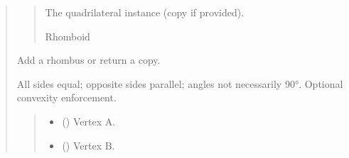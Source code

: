 \documentclass[letterpaper,10pt,english]{sphinxmanual}
\begin{document}
\begin{quote}
\begin{fulllineitems}
\begin{fulllineitems}
\begin{quote}
\begin{description}
\begin{itemize}
\end{itemize}

\sphinxAtStartPar
The quadrilateral instance (copy if provided).

\sphinxAtStartPar
Rhomboid

\end{description}\end{quote}

\end{fulllineitems}


\begin{fulllineitems}
\label{\detokenize{pygeox:pygeox.add_objects.AddNamespace.rhombus}}
\pysigstartsignatures
\pysiglinewithargsret
{}
{\sphinxparamcomma {}\sphinxparamcomma {}\sphinxparamcomma {}\sphinxparamcomma {}\sphinxparamcomma {}\sphinxparamcomma {}}
{}
\pysigstopsignatures
\sphinxAtStartPar
Add a rhombus or return a copy.

\sphinxAtStartPar
All sides equal; opposite sides parallel; angles not necessarily 90°.
Optional convexity enforcement.
\begin{quote}\begin{description}
\begin{itemize}
\item {} 
\sphinxAtStartPar
{} (\sphinxstyleliteralemphasis{\sphinxupquote{ | }}) \textendash{} Vertex A.

\item {} 
\sphinxAtStartPar
{} (\sphinxstyleliteralemphasis{\sphinxupquote{ | }}) \textendash{} Vertex B.


\end{itemize}
\end{description}
\end{quote}
\end{fulllineitems}
\end{fulllineitems}
\end{quote}
\end{document}
